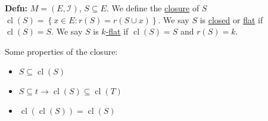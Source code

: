 \documentclass[10pt,letterpaper]{article}
\newcommand{\n}{\hfill\break}
\newcommand{\defn}[1]{\par\noindent\settowidth{\hangindent}{\textbf{Defn: }}\textbf{Defn: }#1\n}
\newcommand{\set}[1]{\left\{#1\right\}}
\DeclareMathOperator{\cl}{cl}
\begin{document}
\defn{$M=(E,\mathcal{I})$, $S\subseteq{}E$. We define the \underline{closure} of $S$ $\cl(S)=\set{x\in{}E:r(S)=r(S\cup{}x)}$.\n
We say $S$ is \underline{closed} or \underline{flat} if $\cl(S)=S$. We say $S$ is \underline{$k$-flat} if $\cl(S)=S$ and $r(S)=k$.}

\par\noindent Some properties of the closure:
\begin{itemize}
	\item $S\subseteq\cl(S)$
	\item $S\subseteq{}t\to\cl(S)\subseteq\cl(T)$
	\item $\cl(\cl(S))=\cl(S)$
\end{itemize}
\end{document}
